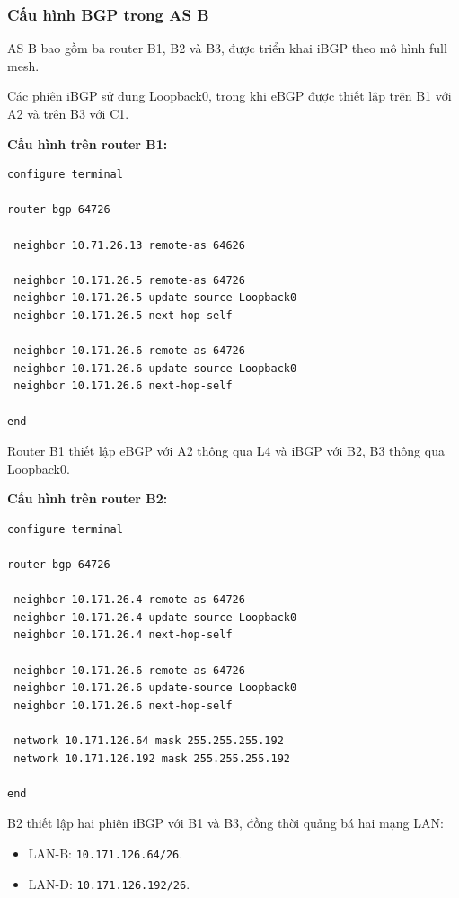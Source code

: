
\subsubsection{Cấu hình BGP trong AS B}

AS B bao gồm ba router B1, B2
và B3, được triển khai iBGP
theo mô hình full mesh.

Các phiên iBGP sử dụng Loopback0,
trong khi eBGP được thiết lập
trên B1 với A2 và trên B3 với C1.

\textbf{Cấu hình trên router B1:}

\begin{lstlisting}
configure terminal

router bgp 64726

 neighbor 10.71.26.13 remote-as 64626

 neighbor 10.171.26.5 remote-as 64726
 neighbor 10.171.26.5 update-source Loopback0
 neighbor 10.171.26.5 next-hop-self

 neighbor 10.171.26.6 remote-as 64726
 neighbor 10.171.26.6 update-source Loopback0
 neighbor 10.171.26.6 next-hop-self

end
\end{lstlisting}

Router B1 thiết lập eBGP với A2
thông qua L4 và iBGP với B2, B3
thông qua Loopback0.

\textbf{Cấu hình trên router B2:}

\begin{lstlisting}
configure terminal

router bgp 64726

 neighbor 10.171.26.4 remote-as 64726
 neighbor 10.171.26.4 update-source Loopback0
 neighbor 10.171.26.4 next-hop-self

 neighbor 10.171.26.6 remote-as 64726
 neighbor 10.171.26.6 update-source Loopback0
 neighbor 10.171.26.6 next-hop-self

 network 10.171.126.64 mask 255.255.255.192
 network 10.171.126.192 mask 255.255.255.192

end
\end{lstlisting}

B2 thiết lập hai phiên iBGP
với B1 và B3, đồng thời quảng bá
hai mạng LAN:

\begin{itemize}
    \item LAN-B: \texttt{10.171.126.64/26}.
    \item LAN-D: \texttt{10.171.126.192/26}.
\end{itemize}

